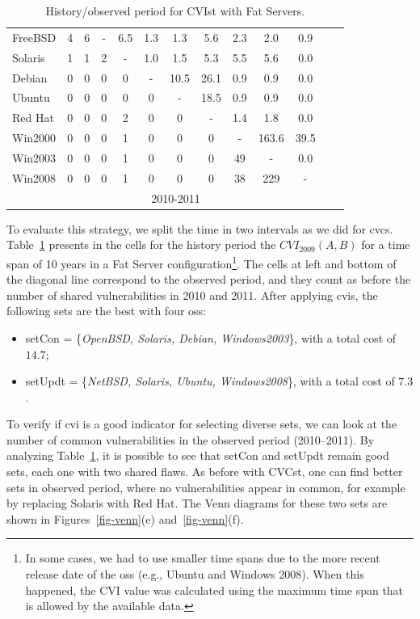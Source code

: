 \begin{table}[!ht]
\begin{center}
{\begin{tabular}{|l|c|c|c|c|c|c|c|c|c|c|c|c|}
FreeBSD & 4 & 6 & - & 6.5 & 1.3 & 1.3 & 5.6 & 2.3 & 2.0 & 0.9&\\ \cline{1-11}
Solaris & 1 & 1 & 2 & - & 1.0 & 1.5 & 5.3 & 5.5 & 5.6 & 0.0&\\ \cline{1-11}
Debian & 0 & 0 & 0 & 0 & - & 10.5 & 26.1 & 0.9 & 0.9 & 0.0&\\ \cline{1-11}
Ubuntu & 0 & 0 & 0 & 0 & 0 & - & 18.5 & 0.9 & 0.9 & 0.0&\\ \cline{1-11}
Red Hat & 0 & 0 & 0 & 2 & 0 & 0 &  - & 1.4 & 1.8 & 0.0&\\ \cline{1-11}
Win2000 & 0 & 0 & 0 & 1 & 0 & 0 & 0 & - & 163.6 & 39.5&\\ \cline{1-11}
Win2003 & 0 & 0 & 0 & 1 & 0 & 0 & 0 & 49 & - & 0.0 &\\ \cline{1-12}
Win2008 & 0 & 0 & 0 & 1 & 0 & 0 & 0 & 38 & 229 & - &\multicolumn{1}{|c}{}  \\ \cline{1-11}
 \multicolumn{1}{c|}{}& \multicolumn{9}{|c|}{2010-2011} & \multicolumn{2}{|c}{}\\ \cline{2-10}
\end{tabular}
\caption{History/observed period for CVIst with Fat Servers.}
\label{tab:strat_ii}
}
\end{center}
\end{table}

To evaluate this strategy, we split the time in two intervals as we did for \gls{cvcs}. 
Table~\ref{tab:strat_ii} presents in the cells for the history period the $\mathit{CVI}_{2009}(A,B)$ for a time span of 10 years in a Fat Server configuration\footnote{In some cases, we had to use smaller time spans due to the more recent release date of the \glspl{os} (e.g., Ubuntu and Windows 2008). When this happened, the CVI value was calculated using the maximum time span that is allowed by the available data.}. 
The cells at left and bottom of the diagonal line correspond to the observed period, and they count as before the number of shared vulnerabilities in 2010 and 2011. After applying \gls{cvis}, the following sets are the best with four \glspl{os}:

\begin{itemize}
\item setCon = \{\emph{OpenBSD, Solaris, Debian, Windows2003}\}, with a total cost of $14.7$;
\item setUpdt = \{\emph{NetBSD, Solaris, Ubuntu, Windows2008}\}, with a total cost of $7.3$.
\end{itemize}

To verify if \gls{cvi} is a good indicator for selecting diverse sets, we can look at the number of common vulnerabilities in the observed period (2010--2011). 
By analyzing Table~\ref{tab:strat_ii}, it is possible to see that setCon and setUpdt remain good sets, each one with two shared flaws. 
As before with CVCst, one can find better sets in observed period, where no vulnerabilities appear in common, for example by replacing Solaris with Red Hat.
The Venn diagrams for these two sets are shown in Figures~\ref{fig-venn}(e) and~\ref{fig-venn}(f).

